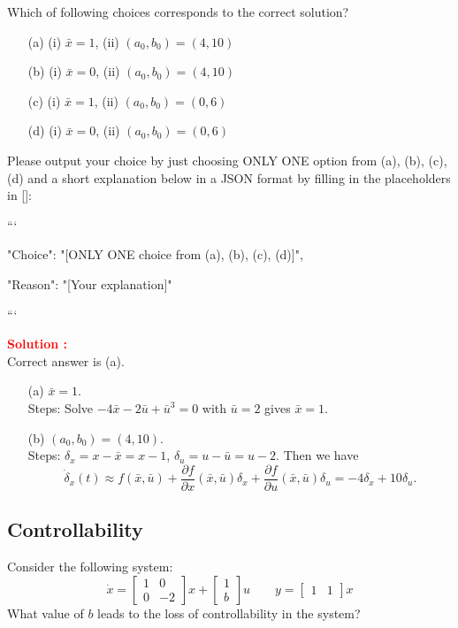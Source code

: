 \documentclass[12pt]{article}
\newcommand{\bmat}[1]{\begin{bmatrix} #1 \end{bmatrix}}
\begin{document}
Which of following choices corresponds to the correct solution?

\begin{itemize}
    \item[(a)] (i) $\bar x = 1$, (ii) $(a_0,b_0) = (4,10)$
    \item[(b)] (i) $\bar x = 0$, (ii) $(a_0,b_0) = (4,10)$
    \item[(c)] (i) $\bar x = 1$, (ii) $(a_0,b_0) = (0,6)$
    \item[(d)] (i) $\bar x = 0$, (ii) $(a_0,b_0) = (0,6)$
\end{itemize}

Please output your choice by just choosing ONLY ONE option from (a), (b), (c), (d) and a short explanation below in a JSON format by filling in the placeholders in []:

```
{

"Choice": "[ONLY ONE choice from (a), (b), (c), (d)]",

"Reason": "[Your explanation]"

}

```

\textbf{\textcolor{red}{Solution :}} \\
Correct answer is (a).\\
\begin{itemize}
    \item[(a)] $\bar{x} = 1.$ \\
    Steps:
    Solve $-4\bar{x} - 2\bar{u} + \bar{u}^3 = 0$ with $\bar{u} = 2$ gives $\bar{x} = 1$.  
    \item[(b)] $(a_0, b_0) = (4, 10).$ \\
    Steps:
    $\delta_x = x - \bar{x} = x-1$, $\delta_u = u - \bar{u} = u -2$. Then we have
    \begin{equation*}
        \dot{\delta}_x(t) \approx f(\bar{x}, \bar{u}) + \frac{\partial f}{\partial x} (\bar{x}, \bar{u}) \delta_x + \frac{\partial f}{\partial u} (\bar{x}, \bar{u}) \delta_u = -4 \delta_x + 10 \delta_u.
        \end{equation*}
\end{itemize}
\clearpage

\subsection{Controllability}

Consider the following system:
$$\dot{x} =\bmat{1 & 0 \\ 0 &-2}x + \bmat{1 \\ b} u \qquad y=\bmat{1 & 1}x$$
What value of $b$ leads to the loss of controllability in the system? 
\end{document}
